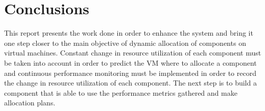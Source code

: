 \section*{Conclusions}
This report presents the work done in order to enhance the system and bring it one step closer to the main objective of dynamic allocation of components on virtual machines. Constant change in resource utilization of each component must be taken into account in order to predict the VM where to allocate a component and continuous performance monitoring must be implemented in order to record the change in resource utilization of each component. The next step is to build a component that is able to use the performance metrics gathered and make allocation plans.
